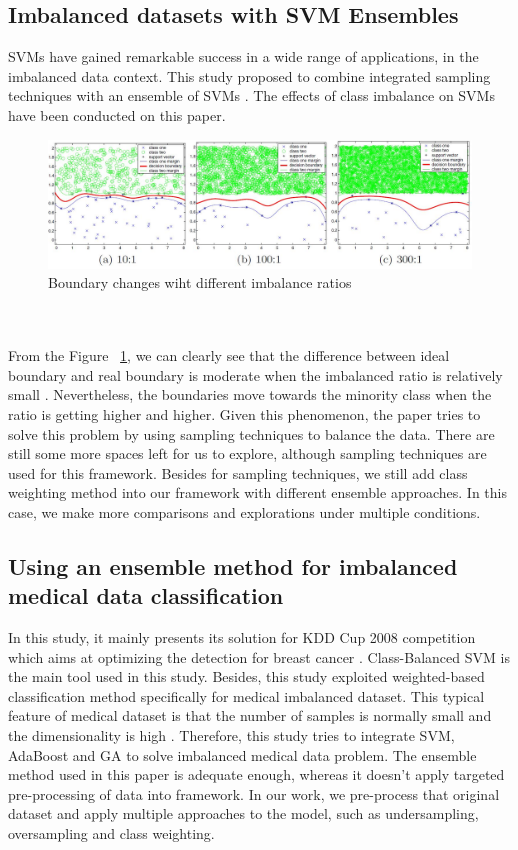 \documentclass{article}
\begin{document}
\subsection{Imbalanced datasets with SVM Ensembles}
SVMs have gained remarkable success in a wide range of applications, in the imbalanced data context. This study proposed to combine integrated sampling techniques with an ensemble of SVMs \citep{ensemble}. The effects of class imbalance on SVMs have been conducted on this paper.
\begin{figure}
  \centering
  \includegraphics[width=\linewidth]{../fig/imbalanced_data.JPG}
  \caption{Boundary changes wiht different imbalance ratios\citep{ensemble}}
  \label{Boundary}
\end{figure}
\\\\From the Figure ~\ref{Boundary}, we can clearly see that the difference between ideal boundary and real boundary is moderate when the imbalanced ratio is relatively small  \citep{ensemble}. Nevertheless, the boundaries move towards the minority class when the ratio is getting higher and higher. Given this phenomenon, the paper tries to solve this problem by using sampling techniques to balance the data.
There are still some more spaces left for us to explore, although sampling techniques are used for this framework. Besides for sampling techniques, we still add class weighting method into our framework with different ensemble approaches. In this case, we make more comparisons and explorations under multiple conditions.

\subsection{Using an ensemble method for imbalanced medical data classification}
In this study, it mainly presents its solution for KDD Cup 2008 competition which aims at optimizing the detection for breast cancer \citep{CBSVM}. Class-Balanced SVM is the main tool used in this study. Besides, this study exploited weighted-based classification method specifically for medical imbalanced dataset. This typical feature of medical dataset is that the number of samples is normally small and the dimensionality is high \citep{fuzzy}. Therefore, this study tries to integrate SVM, AdaBoost and GA to solve imbalanced medical data problem. The ensemble method used in this paper \citep{CBSVM} is adequate enough, whereas it doesn’t apply targeted pre-processing of data into framework. In our work, we pre-process that original dataset and apply multiple approaches to the model, such as undersampling, oversampling and class weighting.
\end{document}
